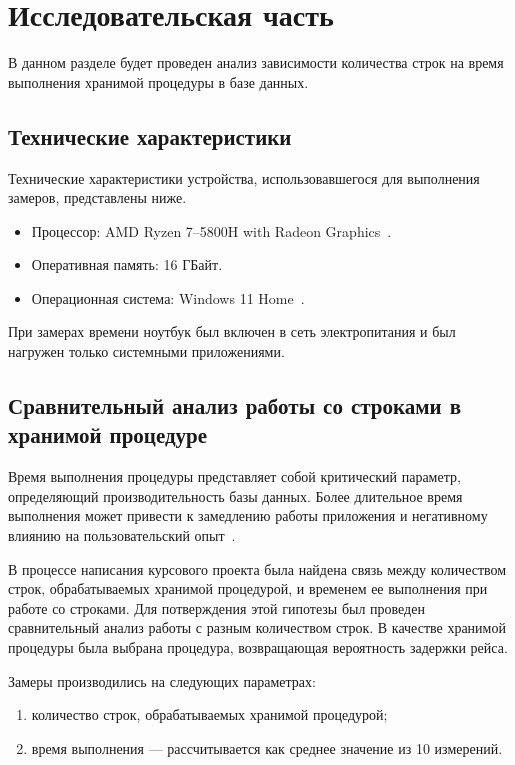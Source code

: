 \chapter{Исследовательская часть}

В данном разделе будет проведен анализ зависимости количества строк на время выполнения хранимой процедуры в базе данных.

\section{Технические характеристики}

Технические характеристики устройства, использовавшегося для выполнения замеров, представлены ниже.

\begin{itemize}[label=---]
	\item Процессор: AMD Ryzen 7--5800H with Radeon Graphics~\cite{amd_ryzen}.
	\item Оперативная память: 16 ГБайт.
	\item Операционная система: Windows 11 Home~\cite{windows}.
\end{itemize}

При замерах времени ноутбук был включен в сеть электропитания и был нагружен только системными приложениями.

\section{Сравнительный анализ работы со \newline строками в хранимой процедуре}

Время выполнения процедуры представляет собой критический параметр, определяющий производительность базы данных.
Более длительное время выполнения может привести к замедлению работы приложения и негативному влиянию на пользовательский опыт~\cite{microsoft}.

В процессе написания курсового проекта была найдена связь между количеством строк, обрабатываемых хранимой процедурой, и временем ее выполнения при работе со строками.
Для потверждения этой гипотезы был проведен сравнительный анализ работы с разным количеством строк.
В качестве хранимой процедуры была выбрана процедура, возвращающая вероятность задержки рейса.


Замеры производились на следующих параметрах:
\begin{enumerate}
	\item количество строк, обрабатываемых хранимой процедурой;
	\item время выполнения --- рассчитывается как среднее значение из 10 измерений.
\end{enumerate}

